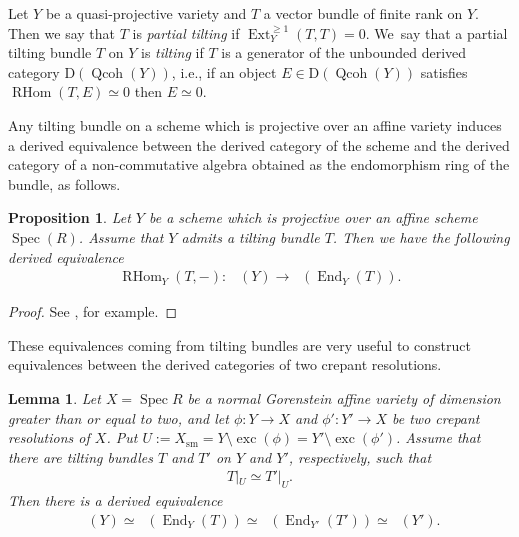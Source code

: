 \documentclass[11pt]{article}
\DeclareMathOperator{\D}{D^b}
\DeclareMathOperator{\End}{End}
\DeclareMathOperator{\exc}{exc}
\DeclareMathOperator{\Ext}{Ext}
\DeclareMathOperator{\Qcoh}{Qcoh}
\DeclareMathOperator{\RHom}{RHom}
\DeclareMathOperator{\Spec}{Spec}
\numberwithin{equation}{section}
\newtheorem{Lemma}[Theorem]{Lemma}
\newtheorem{Proposition}[Theorem]{Proposition}
 { \theoremstyle{definition}
\newtheorem{Definition}[Theorem]{Definition}
\newtheorem{Example}[Theorem]{Example}
\newtheorem{Remark}[Theorem]{Remark} }
\begin{document}
\begin{Definition}
Let $Y$ be a quasi-projective variety and $T$ a vector bundle of finite rank on $Y$.
Then we say that $T$ is \textit{partial tilting} if $\Ext_Y^{\geq 1}(T, T) = 0$.
We~say that a partial tilting bundle $T$ on $Y$ is \textit{tilting} if $T$ is a generator of the unbounded derived category $\mathrm{D}(\Qcoh(Y))$,
i.e., if an object $E \in \mathrm{D}(\Qcoh(Y))$ satisfies $\RHom(T,E) \simeq 0$ then $E \simeq 0$.
\end{Definition}

Any tilting bundle on a scheme which is projective over an affine variety
induces a derived equivalence between the derived category of the scheme and
the derived category of a non-commutative algebra obtained as the endomorphism ring of the bundle, as follows.

\begin{Proposition}
Let $Y$ be a scheme which is projective over an affine scheme $\Spec(R)$.
Assume that $Y$ admits a tilting bundle $T$.
Then we have the following derived equivalence
\begin{gather*}
\RHom_Y(T,-) \colon \ \D(Y) \to \D(\End_Y(T)).
\end{gather*}
\end{Proposition}

\begin{proof}
See \cite[Lemma 3.3]{TU10}, for example.
\end{proof}

These equivalences coming from tilting bundles are very useful to construct equivalences
between the derived categories of two crepant resolutions.

\begin{Lemma} \label{lem tilting equivalence flop}
Let $X = \Spec R$ be a normal Gorenstein affine variety of dimension greater than or equal to two,
and let $\phi\colon Y \to X$ and $\phi'\colon Y' \to X$ be two crepant resolutions of $X$.
Put $U := X_{\mathrm{sm}} = Y \setminus \exc(\phi) = Y' \setminus \exc(\phi')$.
Assume that there are tilting bundles $T$ and $T'$ on $Y$ and $Y'$, respectively, such that
\begin{gather*}
T|_U \simeq T'|_U.
\end{gather*}
Then there is a derived equivalence
\begin{gather*}
\D(Y) \simeq \D(\End_Y(T)) \simeq \D(\End_{Y'}(T')) \simeq \D(Y').
\end{gather*}
\end{Lemma}
\end{document}
